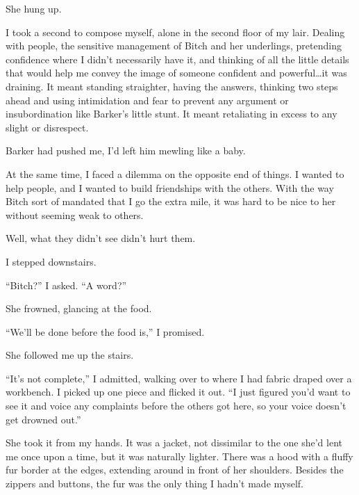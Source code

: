 She hung up.



I took a second to compose myself, alone in the second floor of my lair.  Dealing with people, the sensitive management of Bitch and her underlings, pretending confidence where I didn't necessarily have it, and thinking of all the little details that would help me convey the image of someone confident and powerful\ldots it was draining.  It meant standing straighter, having the answers, thinking two steps ahead and using intimidation and fear to prevent any argument or insubordination like Barker's little stunt.  It meant retaliating in excess to any slight or disrespect.



Barker had pushed me, I'd left him mewling like a baby.



At the same time, I faced a dilemma on the opposite end of things.  I wanted to help people, and I wanted to build friendships with the others.  With the way Bitch sort of mandated that I go the extra mile, it was hard to be nice to her without seeming weak to others.



Well, what they didn't see didn't hurt them.



I stepped downstairs.



``Bitch?'' I asked.  ``A word?''



She frowned, glancing at the food.



``We'll be done before the food is,'' I promised.



She followed me up the stairs.



``It's not complete,'' I admitted, walking over to where I had fabric draped over a workbench.  I picked up one piece and flicked it out.  ``I just figured you'd want to see it and voice any complaints before the others got here, so your voice doesn't get drowned out.''



She took it from my hands.  It was a jacket, not dissimilar to the one she'd lent me once upon a time, but it was naturally lighter.  There was a hood with a fluffy fur border at the edges, extending around in front of her shoulders.  Besides the zippers and buttons, the fur was the only thing I hadn't made myself.



